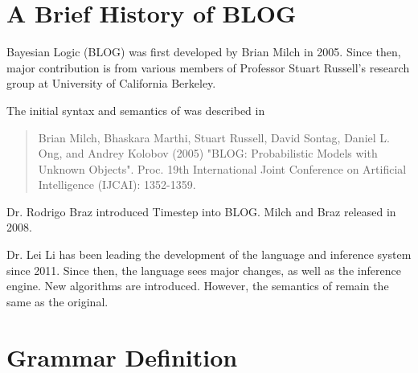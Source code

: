 \documentclass[12pt]{article}
\begin{document}
\appendix

{}


\section{A Brief  History of BLOG}\label{history-appendix}
Bayesian Logic (BLOG) was first developed by Brian Milch in 2005. Since then, major contribution is from various members of Professor Stuart Russell's research group at University of California Berkeley. 

The initial syntax and semantics of \bl was described in 

\begin{quote}
Brian Milch, Bhaskara Marthi, Stuart Russell, David Sontag, Daniel L. Ong, and Andrey Kolobov (2005) "BLOG: Probabilistic Models with Unknown Objects". Proc. 19th International Joint Conference on Artificial Intelligence (IJCAI): 1352-1359.
\end{quote}

Dr. Rodrigo Braz introduced Timestep into BLOG. Milch and Braz released  in 2008.

Dr. Lei Li has been leading the development of the language and \bl inference system since 2011. Since then, the language sees major changes, as well as the inference engine. New algorithms are introduced. However, the semantics of \bl remain the same as the original. 

\section{\bl Grammar Definition}\label{bnf-appendix}
\end{document}

